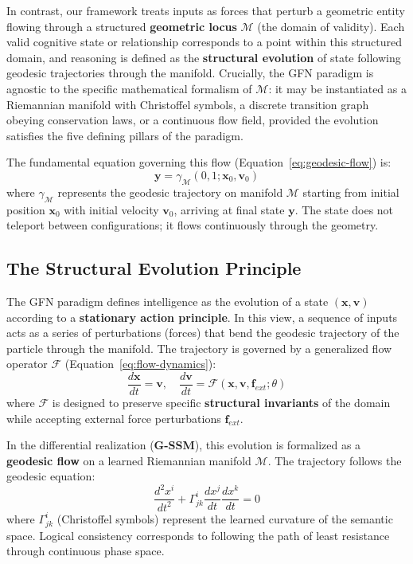 \documentclass[12pt,a4paper]{article}
\begin{document}
In contrast, our framework treats inputs as forces that perturb a geometric entity flowing through a structured \textbf{geometric locus} $\mathcal{M}$ (the domain of validity). Each valid cognitive state or relationship corresponds to a point within this structured domain, and reasoning is defined as the \textbf{structural evolution} of state following geodesic trajectories through the manifold. Crucially, the GFN paradigm is agnostic to the specific mathematical formalism of $\mathcal{M}$: it may be instantiated as a Riemannian manifold with Christoffel symbols, a discrete transition graph obeying conservation laws, or a continuous flow field, provided the evolution satisfies the five defining pillars of the paradigm.

The fundamental equation governing this flow (Equation~\ref{eq:geodesic-flow}) is:
\begin{equation}
    \mathbf{y} = \gamma_{\mathcal{M}}(0, 1; \mathbf{x}_0, \mathbf{v}_0)
    \label{eq:geodesic-flow}
\end{equation}
where $\gamma_{\mathcal{M}}$ represents the geodesic trajectory on manifold $\mathcal{M}$ starting from initial position $\mathbf{x}_0$ with initial velocity $\mathbf{v}_0$, arriving at final state $\mathbf{y}$. The state does not teleport between configurations; it flows continuously through the geometry.

\subsection{The Structural Evolution Principle}
\label{sec:geodesic-equation}

The GFN paradigm defines intelligence as the evolution of a state $(\mathbf{x}, \mathbf{v})$ according to a \textbf{stationary action principle}. In this view, a sequence of inputs acts as a series of perturbations (forces) that bend the geodesic trajectory of the particle through the manifold. The trajectory is governed by a generalized flow operator $\mathcal{F}$ (Equation~\ref{eq:flow-dynamics}):
\begin{equation}
    \frac{d\mathbf{x}}{dt} = \mathbf{v}, \quad \frac{d\mathbf{v}}{dt} = \mathcal{F}(\mathbf{x}, \mathbf{v}, \mathbf{f}_{ext}; \theta)
    \label{eq:flow-dynamics}
\end{equation}
where $\mathcal{F}$ is designed to preserve specific \textbf{structural invariants} of the domain while accepting external force perturbations $\mathbf{f}_{ext}$.

In the differential realization (\textbf{G-SSM}), this evolution is formalized as a \textbf{geodesic flow} on a learned Riemannian manifold $\mathcal{M}$. The trajectory follows the geodesic equation:
\begin{equation}
    \frac{d^2x^i}{dt^2} + \Gamma^i_{jk} \frac{dx^j}{dt} \frac{dx^k}{dt} = 0
    \label{eq:geodesic}
\end{equation}
where $\Gamma^i_{jk}$ (Christoffel symbols) represent the learned curvature of the semantic space. Logical consistency corresponds to following the path of least resistance through continuous phase space.
\end{document}
